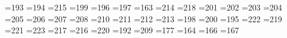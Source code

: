 =193 %
{}=194 %
{}=215 %
{}=199 %
{}=196 %
{}=197 %
{}=163 %
{}=214 %
{}=218 %
{}=201 %
{}=202 %
{}=203 %
{}=204 %
{}=205 %
{}=206 %
{}=207 %
{}=208 %
{}=210 %
{}=211 %
{}=212 %
{}=213 %
{}=198 %
{}=200 %
{}=195 %
{}=222 %
{}=219 %
{}=221 %
{}=223 %
{}=217 %
{}=216 %
{}=220 %
{}=192 %
{}=209 %
{}=177 %
{}=164 %
{}=166 %
{}=167 %
               
            
           